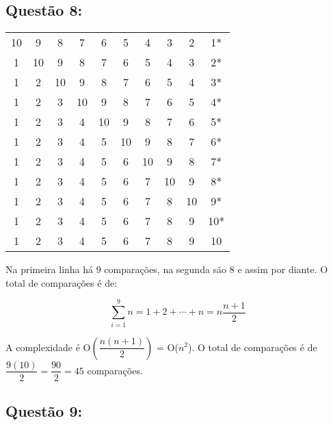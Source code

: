 \documentclass[a4paper,11pt]{article}
\begin{document}
\subsection*{Questão 8:}

\begin{center}
\begin{tabular}{cccccccccc}
  10 & 9 & 8 & 7 & 6 & 5 & 4 & 3& 2 & 1* \\
  1 & 10 & 9 & 8 & 7 & 6 & 5 & 4 & 3& 2*  \\
  1 & 2 & 10 & 9 & 8 & 7 & 6 & 5 & 4 & 3*  \\
  1 & 2 & 3 & 10 & 9 & 8 & 7 & 6 & 5 & 4* \\
  1 & 2 & 3 & 4 & 10 & 9 & 8 & 7 & 6 & 5* \\
  1 & 2 & 3 & 4 & 5 & 10 & 9 & 8 & 7 & 6* \\
  1 & 2 & 3 & 4 & 5 & 6 & 10 & 9 & 8 & 7* \\
  1 & 2 & 3 & 4 & 5 & 6 & 7 & 10 & 9 & 8* \\
  1 & 2 & 3 & 4 & 5 & 6 & 7 & 8 & 10 & 9* \\
  1 & 2 & 3 & 4 & 5 & 6 & 7 & 8 & 9 & 10* \\
  1 & 2 & 3 & 4 & 5 & 6 & 7 & 8 & 9 & 10
\end{tabular}
\end{center}

Na primeira linha há 9 comparações, na segunda são 8 e assim por diante. O total de comparações é de:

\[ \sum_{i=1}^9 n = 1 + 2 + \cdots + n = n\frac{n+1}{2}\]

A complexidade é  O$\left(\dfrac{n(n+1)}{2}\right)$ = O($n^2$). O total de comparações é de $\dfrac{9(10)}{2} = \dfrac{90}{2} = 45$ comparações.

\subsection*{Questão 9:}
\end{document}
